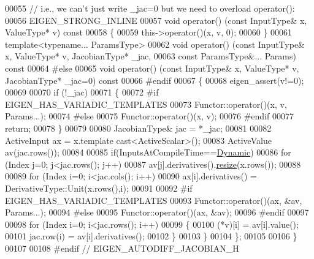 \begin{DoxyCode}
00055   \textcolor{comment}{// i.e., we can't just write \_jac=0 but we need to overload operator():}
00056   EIGEN\_STRONG\_INLINE
00057   \textcolor{keywordtype}{void} operator() (\textcolor{keyword}{const} InputType& x, ValueType* v)\textcolor{keyword}{ const}
00058 \textcolor{keyword}{  }\{
00059       this->operator()(x, v, 0);
00060   \}
00061   \textcolor{keyword}{template}<\textcolor{keyword}{typename}... ParamsType>
00062   \textcolor{keywordtype}{void} operator() (\textcolor{keyword}{const} InputType& x, ValueType* v, JacobianType* \_jac,
00063                    \textcolor{keyword}{const} ParamsType&... Params) \textcolor{keyword}{const}
00064 \textcolor{preprocessor}{#else}
00065   \textcolor{keywordtype}{void} operator() (\textcolor{keyword}{const} InputType& x, ValueType* v, JacobianType* \_jac=0) \textcolor{keyword}{const}
00066 \textcolor{preprocessor}{#endif}
00067   \{
00068     eigen\_assert(v!=0);
00069 
00070     \textcolor{keywordflow}{if} (!\_jac)
00071     \{
00072 \textcolor{preprocessor}{#if EIGEN\_HAS\_VARIADIC\_TEMPLATES}
00073       Functor::operator()(x, v, Params...);
00074 \textcolor{preprocessor}{#else}
00075       Functor::operator()(x, v);
00076 \textcolor{preprocessor}{#endif}
00077       \textcolor{keywordflow}{return};
00078     \}
00079 
00080     JacobianType& jac = *\_jac;
00081 
00082     ActiveInput ax = x.template cast<ActiveScalar>();
00083     ActiveValue av(jac.rows());
00084 
00085     \textcolor{keywordflow}{if}(InputsAtCompileTime==\hyperlink{namespace_eigen_ad81fa7195215a0ce30017dfac309f0b2}{Dynamic})
00086       \textcolor{keywordflow}{for} (Index j=0; j<jac.rows(); j++)
00087         av[j].derivatives().\hyperlink{class_eigen_1_1_plain_object_base_a99d9054ee2d5a40c6e00ded0265e9cea}{resize}(x.rows());
00088 
00089     \textcolor{keywordflow}{for} (Index i=0; i<jac.cols(); i++)
00090       ax[i].derivatives() = DerivativeType::Unit(x.rows(),i);
00091 
00092 \textcolor{preprocessor}{#if EIGEN\_HAS\_VARIADIC\_TEMPLATES}
00093     Functor::operator()(ax, &av, Params...);
00094 \textcolor{preprocessor}{#else}
00095     Functor::operator()(ax, &av);
00096 \textcolor{preprocessor}{#endif}
00097 
00098     \textcolor{keywordflow}{for} (Index i=0; i<jac.rows(); i++)
00099     \{
00100       (*v)[i] = av[i].value();
00101       jac.row(i) = av[i].derivatives();
00102     \}
00103   \}
00104 \};
00105 
00106 \}
00107 
00108 \textcolor{preprocessor}{#endif // EIGEN\_AUTODIFF\_JACOBIAN\_H}
\end{DoxyCode}
